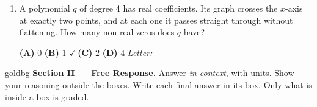 \documentclass[10pt]{article}
\begin{document}
\begin{enumerate}[leftmargin=1.9em, itemsep=10pt]
\item A polynomial $q$ of degree 4 has real coefficients. Its graph crosses the $x$-axis at exactly
      two points, and at each one it passes straight through without flattening. How many
      non-real zeros does $q$ have?

      \smallskip
      \textbf{(A)} $0$ \hspace{2.2em} \textbf{(B)} $1$ \hspace{2.2em} {\color{keyred}\textbf{$\checkmark$\,(C)}} $2$ \hspace{2.2em} \textbf{(D)} $4$
      \hfill\textit{Letter:}~\gradedblank[id=ap5, type=choice, points=1, answer=C]{0.42in}{13pt}

\end{enumerate}

\newpage

\begin{headlinebox}{goldbg}
\small
\textbf{Section II --- Free Response.} Answer \emph{in context}, with units. Show your reasoning
outside the boxes. Write each final answer in its box. Only what is inside a box is graded.
\end{headlinebox}

\vspace{0.04in}
\end{document}
